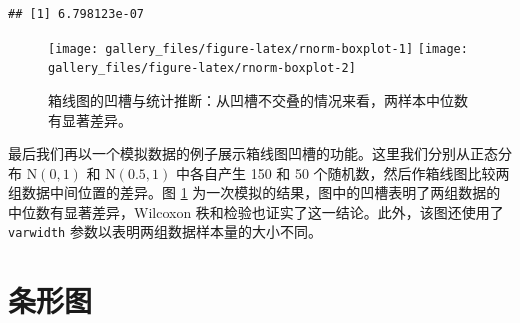 \documentclass[
  b5paper,
  UTF8,twoside]{book}
\begin{document}
\begin{verbatim}
## [1] 6.798123e-07
\end{verbatim}

\begin{figure}

{\centering \texttt{[image: gallery\_files/figure-latex/rnorm-boxplot-1]} \texttt{[image: gallery\_files/figure-latex/rnorm-boxplot-2]} 

}

\caption[箱线图的凹槽与统计推断]{箱线图的凹槽与统计推断：从凹槽不交叠的情况来看，两样本中位数有显著差异。}\label{fig:rnorm-boxplot}
\end{figure}

最后我们再以一个模拟数据的例子展示箱线图凹槽的功能。这里我们分别从正态分布 \(\mathrm{N}(0,1)\) 和 \(\mathrm{N}(0.5,1)\) 中各自产生 150 和 50 个随机数，然后作箱线图比较两组数据中间位置的差异。图 \ref{fig:rnorm-boxplot} 为一次模拟的结果，图中的凹槽表明了两组数据的中位数有显著差异，Wilcoxon 秩和检验也证实了这一结论。此外，该图还使用了 \texttt{varwidth} 参数以表明两组数据样本量的大小不同。

\hypertarget{sec:barplot}{%
\section{条形图}\label{sec:barplot}}
\end{document}
